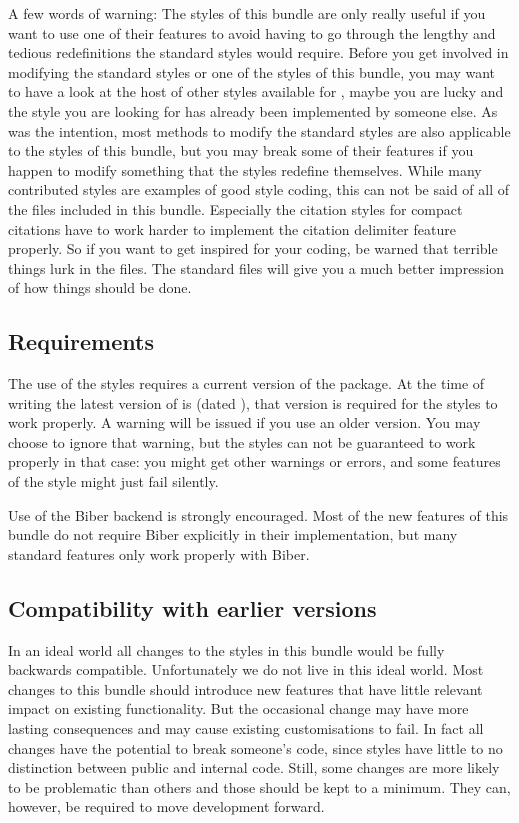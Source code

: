 \documentclass[DIV=9]{scrartcl}
\makeatletter
\newcommand*{\biblatexversion}{\extblx@requiredbiblatexversion}
\newcommand*{\biblatexdate}{\extblx@requiredbiblatexdate}
\newcommand*{\biber}{Biber}
\makeatother
\begin{document}
A few words of warning:
The styles of this bundle are only really useful if you want to use one of their
features to avoid having to go through the lengthy and tedious redefinitions the
standard styles would require.
Before you get involved in modifying the standard styles or one of the styles
of this bundle, you may want to have a look at the host of other styles
available for ,
maybe you are lucky and the style you are looking for has already been
implemented by someone else.
As was the intention, most methods to modify the standard styles are also
applicable to the styles of this bundle, but you may break some of their
features if you happen to modify something that the  styles
redefine themselves.
While many contributed  styles are examples of good 
style coding, this can not be said of all of the files included in this bundle.
Especially the citation styles for compact citations have to work harder
to implement the citation delimiter feature properly.
So if you want to get inspired for your  coding, be warned that
terrible things lurk in the  files.
The standard  files will give you a much better impression of how
things should be done.


\subsection{Requirements}\label{sec:req}
The use of the styles requires a current version of the  package.
At the time of writing the latest version of  is
\biblatexversion{} (dated \biblatexdate),
that version is required for the styles to work properly.
A warning will be issued if you use an older version.
You may choose to ignore that warning, but the styles can not be guaranteed to
work properly in that case:
you might get other warnings or errors, and some features of the style might
just fail silently.

Use of the \biber{} backend is strongly encouraged.
Most of the new features of this bundle do not require \biber{} explicitly in
their implementation, but many  standard features only work
properly with \biber{}.

\subsection{Compatibility with earlier versions}\label{sec:backw}
In an ideal world all changes to the styles in this bundle would be fully
backwards compatible. Unfortunately we do not live in this ideal world.
Most changes to this bundle should introduce new features that have little
relevant impact on existing functionality. But the occasional change
may have more lasting consequences and may cause existing customisations to
fail.
In fact all changes have the potential to break someone's code, since
 styles have little to no distinction between public and internal
code.
Still, some changes are more likely to be problematic than others and those
should be kept to a minimum. They can, however, be required to move development
forward.
\end{document}
